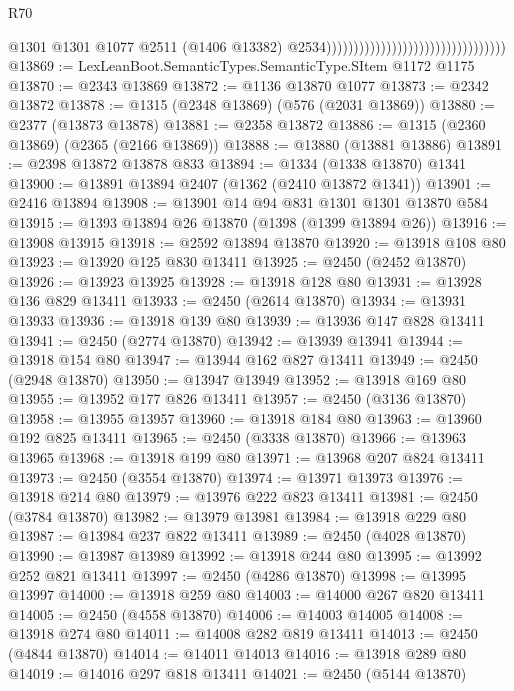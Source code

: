 \begin{lexlean}{R70}
\begin{coremodule}
                                                                      @1301
                                                                      @1301
                                                                      @1077
                                                                      @2511
                                                                      (@1406 @13382)
                                                                      @2534)))))))))))))))))))))))))))))))))
@13869 := LexLeanBoot.SemanticTypes.SemanticType.SItem @1172 @1175
@13870 := @2343 @13869
@13872 := @1136 @13870 @1077
@13873 := @2342 @13872
@13878 := @1315 (@2348 @13869) (@576 (@2031 @13869))
@13880 := @2377 (@13873 @13878)
@13881 := @2358 @13872
@13886 := @1315 (@2360 @13869) (@2365 (@2166 @13869))
@13888 := @13880 (@13881 @13886)
@13891 := @2398 @13872 @13878 @833
@13894 := @1334 (@1338 @13870) @1341
@13900 := @13891 @13894 @2407 (@1362 (@2410 @13872 @1341))
@13901 := @2416 @13894
@13908 := @13901 @14 @94 @831 @1301 @1301 @13870 @584
@13915 := @1393 @13894 @26 @13870 (@1398 (@1399 @13894 @26))
@13916 := @13908 @13915
@13918 := @2592 @13894 @13870
@13920 := @13918 @108 @80
@13923 := @13920 @125 @830 @13411
@13925 := @2450 (@2452 @13870)
@13926 := @13923 @13925
@13928 := @13918 @128 @80
@13931 := @13928 @136 @829 @13411
@13933 := @2450 (@2614 @13870)
@13934 := @13931 @13933
@13936 := @13918 @139 @80
@13939 := @13936 @147 @828 @13411
@13941 := @2450 (@2774 @13870)
@13942 := @13939 @13941
@13944 := @13918 @154 @80
@13947 := @13944 @162 @827 @13411
@13949 := @2450 (@2948 @13870)
@13950 := @13947 @13949
@13952 := @13918 @169 @80
@13955 := @13952 @177 @826 @13411
@13957 := @2450 (@3136 @13870)
@13958 := @13955 @13957
@13960 := @13918 @184 @80
@13963 := @13960 @192 @825 @13411
@13965 := @2450 (@3338 @13870)
@13966 := @13963 @13965
@13968 := @13918 @199 @80
@13971 := @13968 @207 @824 @13411
@13973 := @2450 (@3554 @13870)
@13974 := @13971 @13973
@13976 := @13918 @214 @80
@13979 := @13976 @222 @823 @13411
@13981 := @2450 (@3784 @13870)
@13982 := @13979 @13981
@13984 := @13918 @229 @80
@13987 := @13984 @237 @822 @13411
@13989 := @2450 (@4028 @13870)
@13990 := @13987 @13989
@13992 := @13918 @244 @80
@13995 := @13992 @252 @821 @13411
@13997 := @2450 (@4286 @13870)
@13998 := @13995 @13997
@14000 := @13918 @259 @80
@14003 := @14000 @267 @820 @13411
@14005 := @2450 (@4558 @13870)
@14006 := @14003 @14005
@14008 := @13918 @274 @80
@14011 := @14008 @282 @819 @13411
@14013 := @2450 (@4844 @13870)
@14014 := @14011 @14013
@14016 := @13918 @289 @80
@14019 := @14016 @297 @818 @13411
@14021 := @2450 (@5144 @13870)

\end{coremodule}
\end{lexlean}
